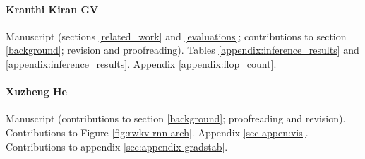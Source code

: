 \documentclass[11pt]{article}
\begin{document}
\paragraph{Kranthi Kiran GV} Manuscript (sections \ref{related_work} and \ref{evaluations}; contributions to section \ref{background}; revision and proofreading).  Tables \ref{appendix:inference_results} and \ref{appendix:inference_results}. Appendix \ref{appendix:flop_count}.

\paragraph{Xuzheng He} Manuscript (contributions to section \ref{background}; proofreading and revision). Contributions to Figure%
\ref{fig:rwkv-rnn-arch}. Appendix \ref{sec-appen:vis}. Contributions to appendix \ref{sec:appendix-gradstab}.

\end{document}
